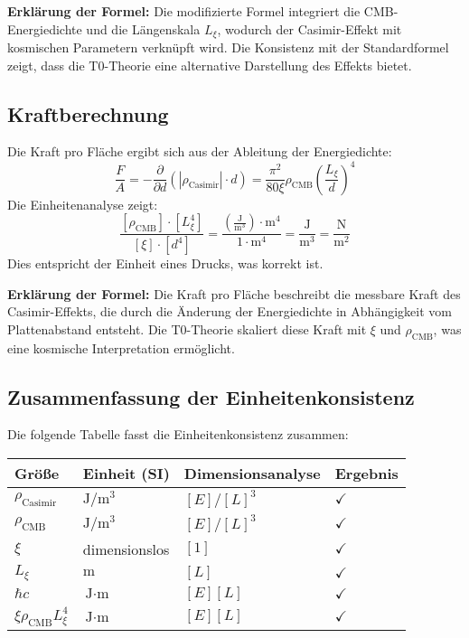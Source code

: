\documentclass{article}
\begin{document}
	\textbf{Erklärung der Formel:} Die modifizierte Formel integriert die CMB-Energiedichte und die Längenskala $L_\xi$, wodurch der Casimir-Effekt mit kosmischen Parametern verknüpft wird. Die Konsistenz mit der Standardformel zeigt, dass die T0-Theorie eine alternative Darstellung des Effekts bietet.
	
	\subsection{Kraftberechnung}
	Die Kraft pro Fläche ergibt sich aus der Ableitung der Energiedichte:
	\begin{equation}
		\frac{F}{A} = -\frac{\partial}{\partial d} \left( |\rho_{\text{Casimir}}| \cdot d \right) = \frac{\pi^2}{80 \xi} \rho_{\text{CMB}} \left( \frac{L_\xi}{d} \right)^4
	\end{equation}
	Die Einheitenanalyse zeigt:
	\begin{equation}
		\frac{[\rho_{\text{CMB}}] \cdot [L_\xi^4]}{[\xi] \cdot [d^4]} = \frac{\left( \frac{\text{J}}{\text{m}^3} \right) \cdot \text{m}^4}{1 \cdot \text{m}^4} = \frac{\text{J}}{\text{m}^3} = \frac{\text{N}}{\text{m}^2}
	\end{equation}
	Dies entspricht der Einheit eines Drucks, was korrekt ist.
	
	\textbf{Erklärung der Formel:} Die Kraft pro Fläche beschreibt die messbare Kraft des Casimir-Effekts, die durch die Änderung der Energiedichte in Abhängigkeit vom Plattenabstand entsteht. Die T0-Theorie skaliert diese Kraft mit $\xi$ und $\rho_{\text{CMB}}$, was eine kosmische Interpretation ermöglicht.
	
	\subsection{Zusammenfassung der Einheitenkonsistenz}
	Die folgende Tabelle fasst die Einheitenkonsistenz zusammen:
	\begin{table}[h]
		\centering
		\begin{tabular}{l l l l}
			\toprule
			Größe & Einheit (SI) & Dimensionsanalyse & Ergebnis \\
			\midrule
			$\rho_{\text{Casimir}}$ & $\text{J}/\text{m}^3$ & $[E]/[L]^3$ & $\checkmark$ \\
			$\rho_{\text{CMB}}$ & $\text{J}/\text{m}^3$ & $[E]/[L]^3$ & $\checkmark$ \\
			$\xi$ & dimensionslos & $[1]$ & $\checkmark$ \\
			$L_\xi$ & $\text{m}$ & $[L]$ & $\checkmark$ \\
			$\hbar c$ & $\text{J} \cdot \text{m}$ & $[E][L]$ & $\checkmark$ \\
			$\xi \rho_{\text{CMB}} L_\xi^4$ & $\text{J} \cdot \text{m}$ & $[E][L]$ & $\checkmark$ \\
			\bottomrule
		\end{tabular}
	\end{table}
	
\end{document}

